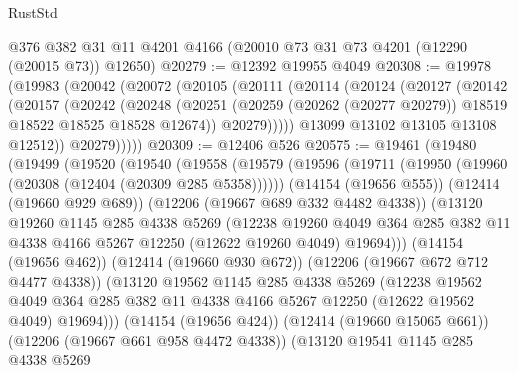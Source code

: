 \begin{lexlean}{RustStd}
\begin{coremodule}
    @376
    @382
    @31
    @11
    @4201
    @4166
    (@20010 @73 @31 @73 @4201 (@12290 (@20015 @73)) @12650)
@20279 := @12392 @19955 @4049
@20308 := @19978
    (@19983
      (@20042
        (@20072
          (@20105
            (@20111
              (@20114
                (@20124
                  (@20127
                    (@20142
                      (@20157
                        (@20242
                          (@20248
                            (@20251
                              (@20259 (@20262 (@20277 @20279)) @18519 @18522 @18525 @18528 @12674))
                            @20279)))))
                  @13099
                  @13102
                  @13105
                  @13108
                  @12512))
              @20279)))))
@20309 := @12406 @526
@20575 := @19461
    (@19480
      (@19499
        (@19520
          (@19540
            (@19558
              (@19579
                (@19596
                  (@19711 (@19950 (@19960 (@20308 (@12404 (@20309 @285 @5358))))))
                  (@14154 (@19656 @555))
                  (@12414 (@19660 @929 @689))
                  (@12206 (@19667 @689 @332 @4482 @4338))
                  (@13120
                    @19260
                    @1145
                    @285
                    @4338
                    @5269
                    (@12238
                      @19260
                      @4049
                      @364
                      @285
                      @382
                      @11
                      @4338
                      @4166
                      @5267
                      @12250
                      (@12622 @19260 @4049)
                      @19694)))
                (@14154 (@19656 @462))
                (@12414 (@19660 @930 @672))
                (@12206 (@19667 @672 @712 @4477 @4338))
                (@13120
                  @19562
                  @1145
                  @285
                  @4338
                  @5269
                  (@12238
                    @19562
                    @4049
                    @364
                    @285
                    @382
                    @11
                    @4338
                    @4166
                    @5267
                    @12250
                    (@12622 @19562 @4049)
                    @19694)))
              (@14154 (@19656 @424))
              (@12414 (@19660 @15065 @661))
              (@12206 (@19667 @661 @958 @4472 @4338))
              (@13120
                @19541
                @1145
                @285
                @4338
                @5269

\end{coremodule}
\end{lexlean}
